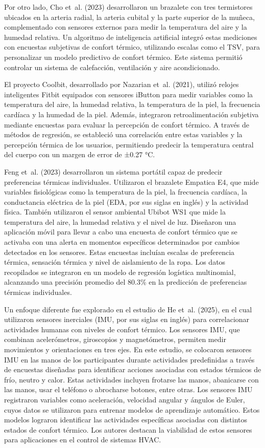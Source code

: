 \documentclass[
  12pt,
  letterpaper,
  DIV=11,
  numbers=noendperiod]{scrreport}
\begin{document}
Por otro lado, Cho et~al. (2023) desarrollaron un brazalete con tres
termistores ubicados en la arteria radial, la arteria cubital y la parte
superior de la muñeca, complementado con sensores externos para medir la
temperatura del aire y la humedad relativa. Un algoritmo de inteligencia
artificial integró estas mediciones con encuestas subjetivas de confort
térmico, utilizando escalas como el TSV, para personalizar un modelo
predictivo de confort térmico. Este sistema permitió controlar un
sistema de calefacción, ventilación y aire acondicionado.

El proyecto Coolbit, desarrollado por Nazarian et~al. (2021), utilizó
relojes inteligentes Fitbit equipados con sensores iButton para medir
variables como la temperatura del aire, la humedad relativa, la
temperatura de la piel, la frecuencia cardíaca y la humedad de la piel.
Además, integraron retroalimentación subjetiva mediante encuestas para
evaluar la percepción de confort térmico. A través de métodos de
regresión, se estableció una correlación entre estas variables y la
percepción térmica de los usuarios, permitiendo predecir la temperatura
central del cuerpo con un margen de error de ±0.27 °C.

Feng et~al. (2023) desarrollaron un sistema portátil capaz de predecir
preferencias térmicas individuales. Utilizaron el brazalete Empatica E4,
que mide variables fisiológicas como la temperatura de la piel, la
frecuencia cardíaca, la conductancia eléctrica de la piel (EDA, por sus
siglas en inglés) y la actividad física. También utilizaron el sensor
ambiental Ubibot WS1 que mide la temperatura del aire, la humedad
relativa y el nivel de luz. Diseñaron una aplicación móvil para llevar a
cabo una encuesta de confort térmico que se activaba con una alerta en
momentos específicos determinados por cambios detectados en los
sensores. Estas encuestas incluían escalas de preferencia térmica,
sensación térmica y nivel de aislamiento de la ropa. Los datos
recopilados se integraron en un modelo de regresión logística
multinomial, alcanzando una precisión promedio del 80.3\% en la
predicción de preferencias térmicas individuales.

Un enfoque diferente fue explorado en el estudio de He et~al. (2025), en
el cual utilizaron sensores inerciales (IMU, por sus siglas en inglés)
para correlacionar actividades humanas con niveles de confort térmico.
Los sensores IMU, que combinan acelerómetros, giroscopios y
magnetómetros, permiten medir movimientos y orientaciones en tres ejes.
En este estudio, se colocaron sensores IMU en las manos de los
participantes durante actividades predefinidas a través de encuestas
diseñadas para identificar acciones asociadas con estados térmicos de
frío, neutro y calor. Estas actividades incluyen frotarse las manos,
abanicarse con las manos, usar el teléfono o abrocharse botones, entre
otras. Los sensores IMU registraron variables como aceleración,
velocidad angular y ángulos de Euler, cuyos datos se utilizaron para
entrenar modelos de aprendizaje automático. Estos modelos lograron
identificar las actividades específicas asociadas con distintos estados
de confort térmico. Los autores destacan la viabilidad de estos sensores
para aplicaciones en el control de sistemas HVAC.
\end{document}
